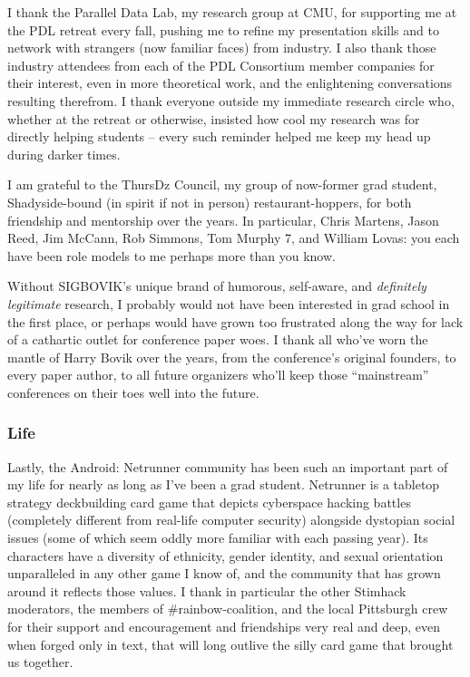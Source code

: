 \documentclass[12pt]{cmuthesis}
\begin{document}
\begin{acknowledgments}
I thank the Parallel Data Lab, my research group at CMU,
for supporting me at the PDL retreat every fall,
pushing me to refine my presentation skills and to network with strangers (now familiar faces) from industry.
I also thank those industry attendees from each of the PDL Consortium member companies
for their interest, even in more theoretical work,
and the enlightening conversations resulting therefrom.
I thank everyone outside my immediate research circle who,
whether at the retreat or otherwise,
insisted how cool my research was for directly helping students --
every such reminder helped me keep my head up during darker times.

I am grateful to the ThursDz Council,
my group of now-former grad student, Shadyside-bound (in spirit if not in person) restaurant-hoppers,
for both friendship and mentorship over the years.
In particular,
Chris Martens,
Jason Reed,
Jim McCann,
Rob Simmons,
Tom Murphy 7,
and
William Lovas:
you each have been role models to me
perhaps more than you know.

Without SIGBOVIK's unique brand of humorous, self-aware, and {\em definitely legitimate} research,
I probably would not have been interested in grad school in the first place,
or perhaps would have grown too frustrated along the way for lack of a cathartic outlet for conference paper woes.
I thank all who've worn the mantle of Harry Bovik over the years,
from the conference's original founders,
to every paper author,
to all future organizers who'll keep those ``mainstream'' conferences on their toes well into the future.

\subsubsection{Life}


Lastly,
the Android: Netrunner community has been such an important part of my life
for nearly as long as I've been a grad student.
Netrunner is a tabletop strategy deckbuilding card game
that depicts cyberspace hacking battles (completely different from real-life computer security)
alongside dystopian social issues (some of which seem oddly more familiar with each passing year).
Its characters have a diversity of ethnicity, gender identity, and sexual orientation
unparalleled in any other game I know of,
and the community that has grown around it reflects those values.
I thank in particular the other Stimhack moderators,
the members of {\sf \#rainbow-coalition},
and the local Pittsburgh crew
for their support and encouragement
and friendships very real and deep, even when forged only in text,
that will long outlive the silly card game that brought us together.

\end{acknowledgments}
\end{document}
